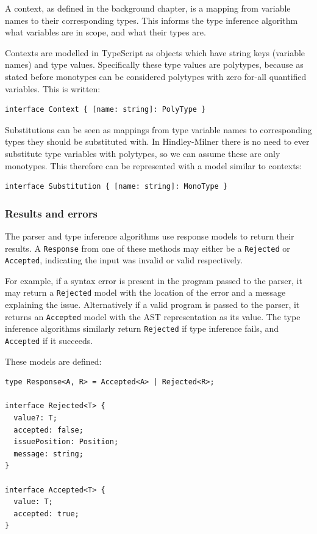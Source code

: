 \documentclass[a4paper,fleqn,oneside,12pt]{report}
\begin{document}
A context, as defined in the background chapter, is a mapping from variable names to their corresponding types. This informs the type inference algorithm what variables are in scope, and what their types are.

Contexts are modelled in TypeScript as objects which have string keys (variable names) and type values. Specifically these type values are polytypes, because as stated before monotypes can be considered polytypes with zero for-all quantified variables. This is written:

\begin{verbatim}
interface Context { [name: string]: PolyType }
\end{verbatim}
Substitutions can be seen as mappings from type variable names to corresponding types they should be substituted with. In Hindley-Milner there is no need to ever substitute type variables with polytypes, so we can assume these are only monotypes. This therefore can be represented with a model similar to contexts:

\begin{verbatim}
interface Substitution { [name: string]: MonoType }
\end{verbatim}

\subsubsection{Results and errors}\label{id:h.5yk2zijb0axq}

The parser and type inference algorithms use response models to return their results. A \texttt{Response} from one of these methods may either be a \texttt{Rejected} or \texttt{Accepted}, indicating the input was invalid or valid respectively.

For example, if a syntax error is present in the program passed to the parser, it may return a \texttt{Rejected} model with the location of the error and a message explaining the issue. Alternatively if a valid program is passed to the parser, it returns an \texttt{Accepted} model with the AST representation as its value. The type inference algorithms similarly return \texttt{Rejected} if type inference fails, and \texttt{Accepted} if it succeeds.

These models are defined:

\begin{verbatim}
type Response<A, R> = Accepted<A> | Rejected<R>;

interface Rejected<T> {
  value?: T;
  accepted: false;
  issuePosition: Position;
  message: string;
}

interface Accepted<T> {
  value: T;
  accepted: true;
}
\end{verbatim}
\end{document}
